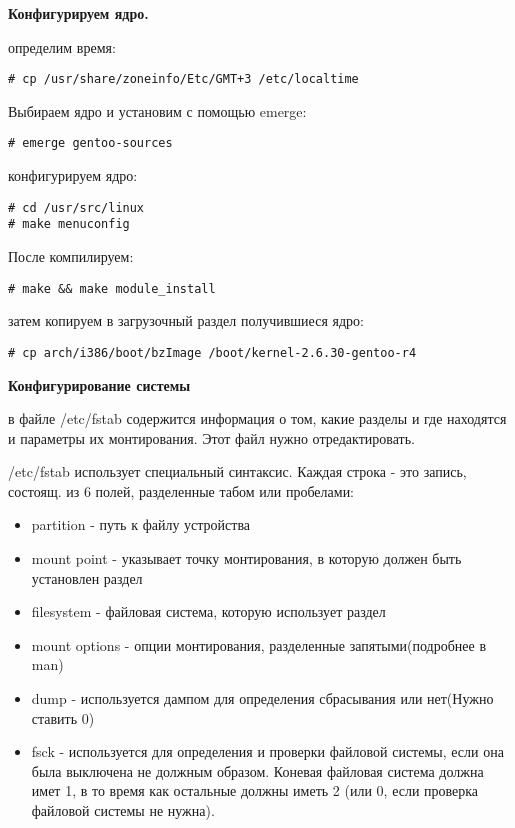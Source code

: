 \documentclass[12pt, a4paper]{article}
\begin{document}
{\bf Конфигурируем ядро.}

определим время:

\begin{verbatim}
# cp /usr/share/zoneinfo/Etc/GMT+3 /etc/localtime
\end{verbatim}

Выбираем ядро и установим с помощью emerge:

\begin{verbatim}
# emerge gentoo-sources
\end{verbatim}

конфигурируем ядро:

\begin{verbatim}
# cd /usr/src/linux
# make menuconfig
\end{verbatim}

После компилируем:

\begin{verbatim}
# make && make module_install
\end{verbatim}

затем копируем в загрузочный раздел получившиеся ядро:

\begin{verbatim}
# cp arch/i386/boot/bzImage /boot/kernel-2.6.30-gentoo-r4
\end{verbatim}

{\bf Конфигурирование системы}

в файле /etc/fstab  содержится информация о том, какие разделы и где находятся и параметры их монтирования. Этот файл нужно отредактировать.

/etc/fstab использует специальный синтаксис. Каждая строка - это запись, состоящ. из 6 полей, разделенные табом или пробелами:
\begin{itemize}
\item partition - путь к файлу устройства
\item mount point - указывает точку монтирования, в которую должен быть установлен раздел
\item filesystem - файловая система, которую использует раздел
\item mount options - опции монтирования, разделенные запятыми(подробнее в man)
\item dump - используется дампом для определения сбрасывания или нет(Нужно ставить 0)
\item fsck - используется для определения и проверки файловой системы, если она была выключена не должным образом. Коневая файловая система должна имет 1, в то время как остальные должны иметь 2 (или 0, если проверка файловой системы не нужна).
\end{itemize}
\end{document}
